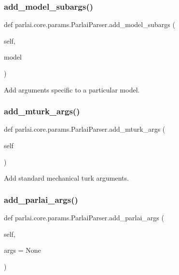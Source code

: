 \subsubsection{\texorpdfstring{add\+\_\+model\+\_\+subargs()}{add\_model\_subargs()}}
{\footnotesize\ttfamily def parlai.\+core.\+params.\+Parlai\+Parser.\+add\+\_\+model\+\_\+subargs (\begin{DoxyParamCaption}\item[{}]{self,  }\item[{}]{model }\end{DoxyParamCaption})}

\begin{DoxyVerb}Add arguments specific to a particular model.
\end{DoxyVerb}
 \mbox{\label{classparlai_1_1core_1_1params_1_1ParlaiParser_a6043b5b5c36f99f85a9791dd8dc35551}} 
\subsubsection{\texorpdfstring{add\+\_\+mturk\+\_\+args()}{add\_mturk\_args()}}
{\footnotesize\ttfamily def parlai.\+core.\+params.\+Parlai\+Parser.\+add\+\_\+mturk\+\_\+args (\begin{DoxyParamCaption}\item[{}]{self }\end{DoxyParamCaption})}

\begin{DoxyVerb}Add standard mechanical turk arguments.
\end{DoxyVerb}
 \mbox{\label{classparlai_1_1core_1_1params_1_1ParlaiParser_a3dfaa7781346d8c974d60684e81cb705}} 
\subsubsection{\texorpdfstring{add\+\_\+parlai\+\_\+args()}{add\_parlai\_args()}}
{\footnotesize\ttfamily def parlai.\+core.\+params.\+Parlai\+Parser.\+add\+\_\+parlai\+\_\+args (\begin{DoxyParamCaption}\item[{}]{self,  }\item[{}]{args = {\ttfamily None} }\end{DoxyParamCaption})}

